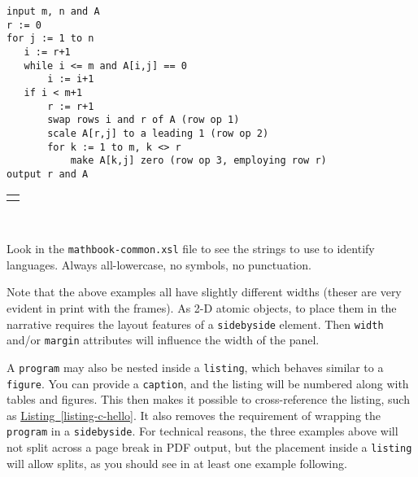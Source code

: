 \documentclass[10pt,]{article}
\theoremstyle{plain}
\theoremstyle{definition}
\theoremstyle{definition}
\theoremstyle{definition}
\theoremstyle{definition}
\theoremstyle{definition}
\theoremstyle{definition}
\numberwithin{equation}{section}
\newlength{\panelmax}
\begin{document}
{%
\setlength{\panelmax}{0pt}
\ifdefined\panelboxAprogram\else\newsavebox{\panelboxAprogram}\fi%
\begin{lrbox}{\panelboxAprogram}
\begin{lstlisting}[style=genericinput, linewidth=0.9\linewidth]
input m, n and A
r := 0
for j := 1 to n
   i := r+1
   while i <= m and A[i,j] == 0
       i := i+1
   if i < m+1
       r := r+1
       swap rows i and r of A (row op 1)
       scale A[r,j] to a leading 1 (row op 2)
       for k := 1 to m, k <> r
           make A[k,j] zero (row op 3, employing row r)
output r and A
\end{lstlisting}
\end{lrbox}
\ifdefined\phAprogram\else\newlength{\phAprogram}\fi%
\setlength{\phAprogram}{\ht\panelboxAprogram+\dp\panelboxAprogram}
\settototalheight{\phAprogram}{\usebox{\panelboxAprogram}}
\setlength{\panelmax}{\maxof{\panelmax}{\phAprogram}}
\leavevmode%
\setlength{\tabcolsep}{0\linewidth}
\par\medskip\noindent
\hspace*{0.05\linewidth}%
\begin{tabular}{@{}*{1}{c}@{}}
\begin{minipage}[c][\panelmax][t]{0.9\linewidth}\usebox{\panelboxAprogram}\end{minipage}\end{tabular}\\
}%
\par
\hypertarget{p-623}{}%
Look in the \lstinline?mathbook-common.xsl? file to see the strings to use to identify languages.  Always all-lowercase, no symbols, no punctuation.%
\par
\hypertarget{p-624}{}%
Note that the above examples all have slightly different widths (theser are very evident in print with the frames).  As 2-D atomic objects, to place them in the narrative requires the layout features of a \lstinline?sidebyside? element.  Then \lstinline?width? and/or \lstinline?margin? attributes will influence the width of the panel.%
\par
\hypertarget{p-625}{}%
A \lstinline?program? may also be nested inside a \lstinline?listing?, which behaves similar to a \lstinline?figure?.  You can provide a \lstinline?caption?, and the listing will be numbered along with tables and figures.  This then makes it possible to cross-reference the listing, such as \hyperref[listing-c-hello]{Listing~\ref{listing-c-hello}}.  It also removes the requirement of wrapping the \lstinline?program? in a \lstinline?sidebyside?.  For technical reasons, the three examples above will not split across a page break in PDF output, but the placement inside a \lstinline?listing? will allow splits, as you should see in at least one example following.%
\end{document}
